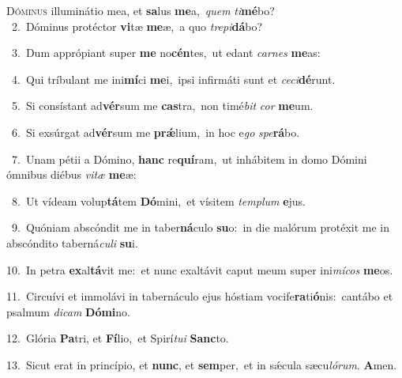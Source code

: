 \lettrine{\initial\textcolor{\initialcolor}{D}}{óminus} illuminátio mea, et \textbf{sa}\-lus \textbf{me}\-a,~\star \textit{quem} \textit{ti}\-\textbf{mé}bo?\\
{\numbfont\textcolor{\numbcolor}{~2.}}~Dóminus protéctor \textbf{vi}\-tæ \textbf{me}\-æ,~\star a quo \textit{tre}\-\textit{pi}\textbf{dá}bo?\par
{\numbfont\textcolor{\numbcolor}{~3.}}~Dum apprópiant super \textbf{me} no\-\textbf{cén}\-tes,~\star ut edant \textit{car}\-\textit{nes} \textbf{me}\-as:\par
{\numbfont\textcolor{\numbcolor}{~4.}}~Qui tríbulant me ini\-\textbf{mí}\-ci \textbf{me}\-i,~\star ipsi infirmáti sunt et \textit{ce}\-\textit{ci}\textbf{dé}runt.\par
{\numbfont\textcolor{\numbcolor}{~5.}}~Si consístant ad\-\textbf{vér}\-sum me \textbf{cas}\-tra,~\star non timé\textit{bit} \textit{cor} \textbf{me}\-um.\par
{\numbfont\textcolor{\numbcolor}{~6.}}~Si exsúrgat ad\-\textbf{vér}\-sum me \textbf{prǽ}\-lium,~\star in hoc e\textit{go} \textit{spe}\-\textbf{rá}bo.\par
{\numbfont\textcolor{\numbcolor}{~7.}}~Unam pétii a Dómino, \textbf{hanc} re\-\textbf{quí}\-ram,~\star ut inhábitem in domo Dómini ómnibus diébus \textit{vi}\-\textit{tæ} \textbf{me}\-æ:\par
{\numbfont\textcolor{\numbcolor}{~8.}}~Ut vídeam volup\-\textbf{tá}\-tem \textbf{Dó}\-mini,~\star et vísitem \textit{tem}\-\textit{plum} \textbf{e}\-jus.\par
{\numbfont\textcolor{\numbcolor}{~9.}}~Quóniam abscóndit me in taber\-\textbf{ná}\-culo \textbf{su}\-o:~\star in die malórum protéxit me in abscóndito taberná\-\textit{cu}\-\textit{li} \textbf{su}\-i.\par
{\numbfont\textcolor{\numbcolor}{10.}}~In petra \textbf{ex}\-al\-\textbf{tá}\-vit me:~\star et nunc exaltávit caput meum super ini\-\textit{mí}\-\textit{cos} \textbf{me}\-os.\par
{\numbfont\textcolor{\numbcolor}{11.}}~Circuívi et immolávi in tabernáculo ejus hóstiam vocife\-\textbf{ra}\-ti\-\textbf{ó}\-nis:~\star cantábo et psalmum \textit{di}\-\textit{cam} \textbf{Dó}\-\textbf{mi}no.\par
{\numbfont\textcolor{\numbcolor}{12.}}~Glória \textbf{Pa}\-tri, et \textbf{Fí}\-lio,~\star et Spirí\-\textit{tu}\-\textit{i} \textbf{Sanc}\-to.\par
{\numbfont\textcolor{\numbcolor}{13.}}~Sicut erat in princípio, et \textbf{nunc}\-, et \textbf{sem}\-per,~\star et in sǽcula sæcu\-\textit{ló}\-\textit{rum}. \textbf{A}\-men.\par
